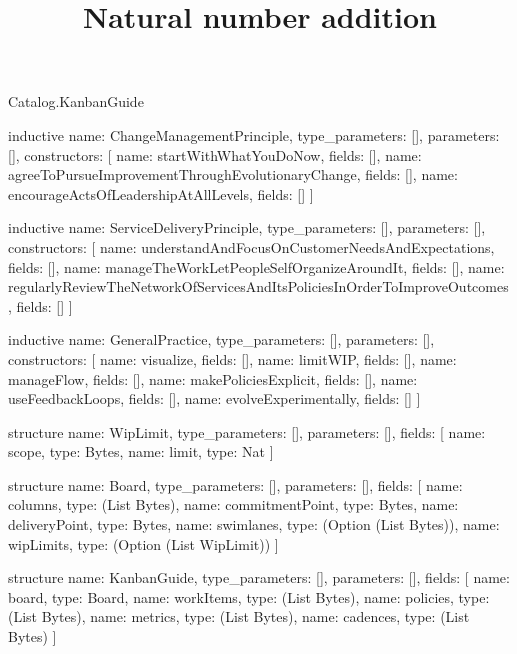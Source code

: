\begin{lexlean}{Catalog.KanbanGuide}
\title{Natural number addition}
\begin{semanticmodule}
inductive{
  name: ChangeManagementPrinciple,
  type_parameters: [],
  parameters: [],
  constructors: [
    {name: startWithWhatYouDoNow, fields: []},
    {name: agreeToPursueImprovementThroughEvolutionaryChange, fields: []},
    {name: encourageActsOfLeadershipAtAllLevels, fields: []}
  ]
}

inductive{
  name: ServiceDeliveryPrinciple,
  type_parameters: [],
  parameters: [],
  constructors: [
    {name: understandAndFocusOnCustomerNeedsAndExpectations, fields: []},
    {name: manageTheWorkLetPeopleSelfOrganizeAroundIt, fields: []},
    {name: regularlyReviewTheNetworkOfServicesAndItsPoliciesInOrderToImproveOutcomes, fields: []}
  ]
}

inductive{
  name: GeneralPractice,
  type_parameters: [],
  parameters: [],
  constructors: [
    {name: visualize, fields: []},
    {name: limitWIP, fields: []},
    {name: manageFlow, fields: []},
    {name: makePoliciesExplicit, fields: []},
    {name: useFeedbackLoops, fields: []},
    {name: evolveExperimentally, fields: []}
  ]
}

structure{
  name: WipLimit,
  type_parameters: [],
  parameters: [],
  fields: [
    {name: scope, type: Bytes},
    {name: limit, type: Nat}
  ]
}

structure{
  name: Board,
  type_parameters: [],
  parameters: [],
  fields: [
    {name: columns, type: (List Bytes)},
    {name: commitmentPoint, type: Bytes},
    {name: deliveryPoint, type: Bytes},
    {name: swimlanes, type: (Option (List Bytes))},
    {name: wipLimits, type: (Option (List WipLimit))}
  ]
}

structure{
  name: KanbanGuide,
  type_parameters: [],
  parameters: [],
  fields: [
    {name: board, type: Board},
    {name: workItems, type: (List Bytes)},
    {name: policies, type: (List Bytes)},
    {name: metrics, type: (List Bytes)},
    {name: cadences, type: (List Bytes)}
  ]
}
\end{semanticmodule}
\end{lexlean}
